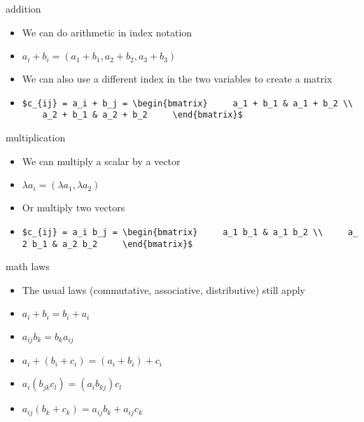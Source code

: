 \documentclass[
  letterpaper,
  ignorenonframetext,
  aspectratio=43,
  handout,
  12pt]{beamer}
\providecommand{\tightlist}{%
  \setlength{\itemsep}{0pt}\setlength{\parskip}{0pt}}
\providecommand{\tightlist}{%
\setlength{\itemsep}{0pt}\setlength{\parskip}{0pt}}
\begin{document}
\begin{frame}[fragile]{addition}
\protect\hypertarget{addition}{}
\begin{itemize}
\tightlist
\item
  We can do arithmetic in index notation
\item
  \(a_i + b_i = (a_1+b_1, a_2+b_2, a_3+b_3)\)
\item
  We can also use a different index in the two variables to create a
  matrix
\item
  \texttt{\$c\_\{ij\}\ =\ a\_i\ +\ b\_j\ =\ \textbackslash{}begin\{bmatrix\}\ \ \ \ \ a\_1\ +\ b\_1\ \&\ a\_1\ +\ b\_2\ \textbackslash{}\textbackslash{}\ \ \ \ \ a\_2\ +\ b\_1\ \&\ a\_2\ +\ b\_2\ \ \ \ \ \textbackslash{}end\{bmatrix\}\$}
\end{itemize}
\end{frame}

\begin{frame}[fragile]{multiplication}
\protect\hypertarget{multiplication}{}
\begin{itemize}
\tightlist
\item
  We can multiply a scalar by a vector
\item
  \(\lambda a_i = (\lambda a_1, \lambda a_2)\)
\item
  Or multiply two vectors
\item
  \texttt{\$c\_\{ij\}\ =\ a\_i\ b\_j\ =\ \textbackslash{}begin\{bmatrix\}\ \ \ \ \ a\_1\ b\_1\ \&\ a\_1\ b\_2\ \textbackslash{}\textbackslash{}\ \ \ \ \ a\_2\ b\_1\ \&\ a\_2\ b\_2\ \ \ \ \ \textbackslash{}end\{bmatrix\}\$}
\end{itemize}
\end{frame}

\begin{frame}{math laws}
\protect\hypertarget{math-laws}{}
\begin{itemize}
\tightlist
\item
  The usual laws (commutative, associative, distributive) still apply
\item
  \(a_i + b_i = b_i + a_i\)
\item
  \(a_{ij} b_k = b_k a_{ij}\)
\item
  \(a_i + (b_i + c_i) = (a_i + b_i) + c_i\)
\item
  \(a_i(b_{jk}c_l) = (a_i b_{kj})c_l\)
\item
  \(a_{ij}(b_k + c_k) = a_{ij}b_k + a_{ij}c_k\)
\end{itemize}
\end{frame}
\end{document}

